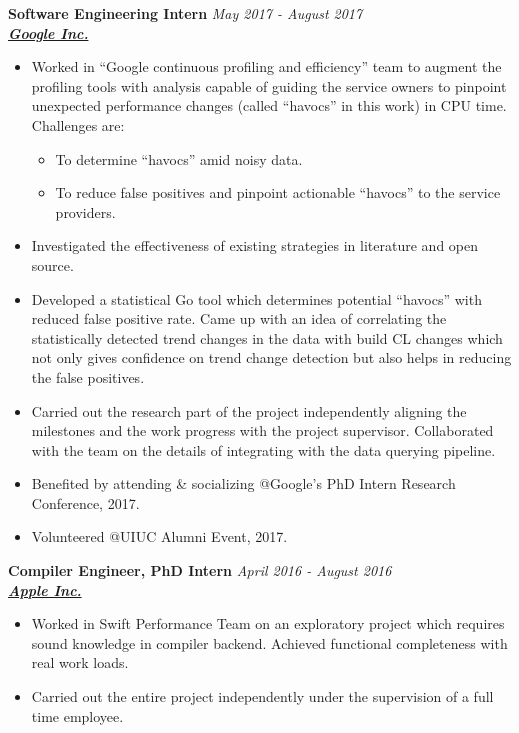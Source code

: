 \documentclass[9pt]{article}
\newenvironment{changemargin}[2]{%
  \begin{list}{}{%
    \setlength{\topsep}{0pt}%
    \setlength{\leftmargin}{#1}%
    \setlength{\rightmargin}{#2}%
    \setlength{\listparindent}{\parindent}%
    \setlength{\itemindent}{\parindent}%
    \setlength{\parsep}{\parskip}%
  }%
  \item[]}{\end{list}
}
\newenvironment{body} {
	\vspace*{-16pt}
	\begin{changemargin}{-0.25in}{-0.5in}
  }	
	{\end{changemargin}
}
\begin{document}
\begin{body}
        \textbf{Software Engineering Intern} \hfill \emph{May 2017 - August 2017}\\
	\textbf{\emph{\href{https://www.google.com/intl/en/about/}{Google Inc.}}}
	\begin{itemize} \itemsep -0pt
		\item  Worked in ``Google continuous profiling and efficiency'' team to augment the
			profiling tools with analysis capable of
			guiding the service owners to pinpoint unexpected
			performance changes (called ``havocs'' in this work) in CPU time. Challenges are:
			\begin{itemize}
				\item To determine ``havocs'' amid noisy data.
				\item To reduce false positives and pinpoint actionable ``havocs'' to the service providers.
			\end{itemize}
		\item Investigated the effectiveness of existing strategies in literature and open source.
		\item
			Developed a statistical Go tool which determines
			potential ``havocs'' with reduced false positive rate.
			Came up with an idea of correlating the
			statistically detected trend changes in the data with
			build CL changes which not only gives confidence on
			trend change detection but also helps in reducing the
			false positives.

		\item Carried out the research part of the project
			independently aligning the milestones and the work
			progress with the project supervisor. Collaborated with
			the team on the details of integrating with the data
			querying pipeline.
		\item Benefited by attending \& socializing @Google's PhD Intern Research Conference, 2017.
		\item Volunteered @UIUC Alumni Event, 2017.
	\end{itemize}


 \medskip
        \textbf{Compiler Engineer, PhD Intern} \hfill \emph{April 2016 - August 2016}\\
	\textbf{\emph{\href{http://www.apple.com}{Apple Inc.}}}
	\begin{itemize} \itemsep -0pt
                \item  Worked in Swift Performance Team on an
                  exploratory project which requires sound knowledge in
                  compiler backend. Achieved functional completeness with real
                  work loads.
		\item Carried out the entire project independently under the
			supervision of a full time employee.
	\end{itemize}


\end{body}
\end{document}
